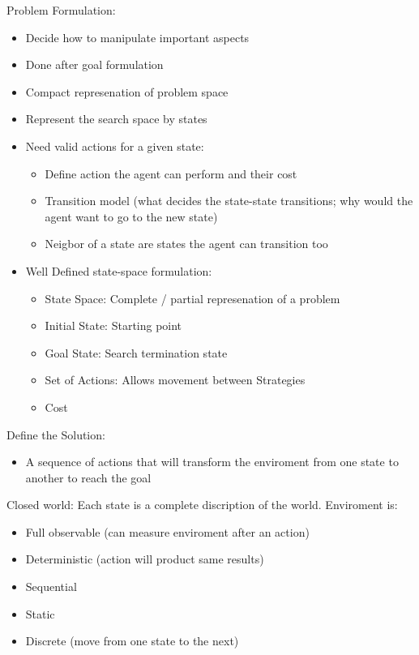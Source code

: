 \documentclass{article}
\begin{document}
    Problem Formulation:
    \begin{itemize}
        \item Decide how to manipulate important aspects
        \item Done after goal formulation
        \item Compact represenation of problem space
        \item Represent the search space by states 
        \item Need valid actions for a given state:
        \begin{itemize}
            \item Define action the agent can perform and their cost
            \item Transition model (what decides the state-state transitions; why would the agent want to go to the new state)
            \item Neigbor of a state are states the agent can transition too
        \end{itemize}
        \item Well Defined state-space formulation:
        \begin{itemize}
            \item State Space: Complete / partial represenation of a problem 
            \item Initial State: Starting point
            \item Goal State: Search termination state
            \item Set of Actions: Allows movement between Strategies
            \item Cost
        \end{itemize}
    \end{itemize}

    Define the Solution:
    \begin{itemize}
        \item A sequence of actions that will transform the enviroment from one state to another to reach the goal
    \end{itemize}

    Closed world: Each state is a complete discription of the world.
    Enviroment is:
    \begin{itemize}
        \item Full observable (can measure enviroment after an action)
        \item Deterministic (action will product same results)
        \item Sequential
        \item Static
        \item Discrete (move from one state to the next)
    \end{itemize}
\end{document}
